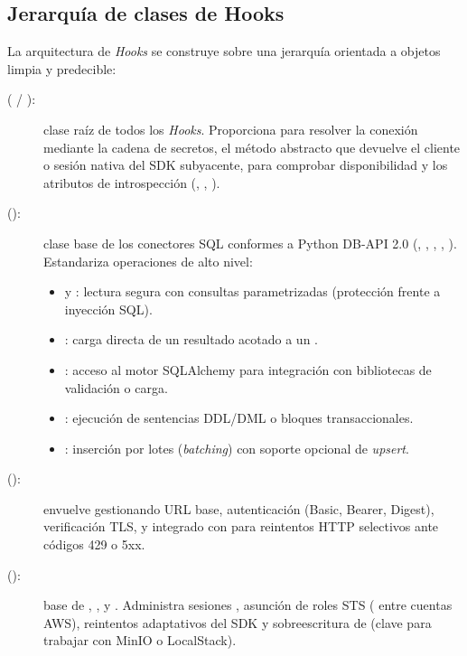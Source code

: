 \subsection{Jerarquía de clases de Hooks}

La arquitectura de \textit{Hooks} se construye sobre una jerarquía orientada a objetos limpia y predecible:

\begin{description}
  \item[ ( / ):] clase raíz de todos los \textit{Hooks}. Proporciona  para resolver la conexión mediante la cadena de secretos, el método abstracto  que devuelve el cliente o sesión nativa del SDK subyacente,  para comprobar disponibilidad y los atributos de introspección (, , ).
  \item[ ():] clase base de los conectores SQL conformes a Python DB-API 2.0 (, , , , ). Estandariza operaciones de alto nivel:
    \begin{itemize}
      \item {} y : lectura segura con consultas parametrizadas (protección frente a inyección SQL).
      \item {}: carga directa de un resultado acotado a un .
      \item {}: acceso al motor SQLAlchemy para integración con bibliotecas de validación o carga.
      \item {}: ejecución de sentencias DDL/DML o bloques transaccionales.
      \item {}: inserción por lotes (\textit{batching}) con soporte opcional de \textit{upsert}.
    \end{itemize}
  \item[ ():] envuelve  gestionando URL base, autenticación (Basic, Bearer, Digest), verificación TLS,  y  integrado con  para reintentos HTTP selectivos ante códigos 429 o 5xx.
  \item[ ():] base de , ,  y . Administra sesiones , asunción de roles STS ( entre cuentas AWS), reintentos adaptativos del SDK y sobreescritura de  (clave para trabajar con MinIO o LocalStack).
\end{description}

